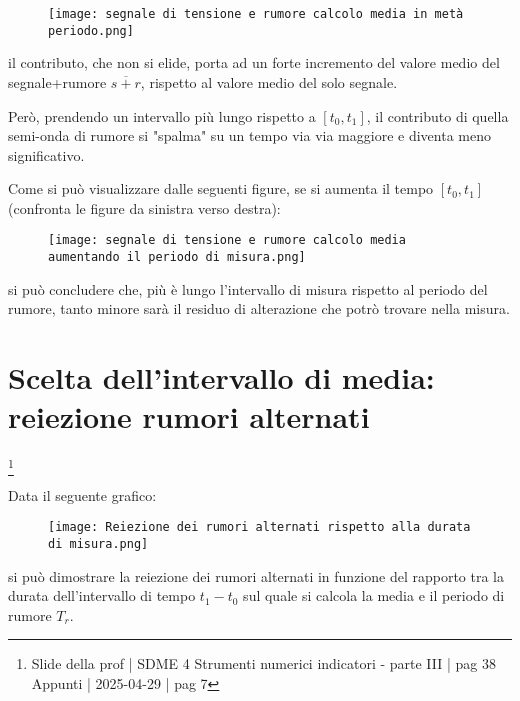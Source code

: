 \begin{figure}[h]
    \centering
    \texttt{[image: segnale di tensione e rumore calcolo media in metà periodo.png]}
\end{figure}

il contributo, che non si elide, porta ad un forte incremento del valore medio del segnale+rumore $\overline{s + r}$, 
rispetto al valore medio del solo segnale. \newline 

Però, prendendo un intervallo più lungo rispetto a $[t_0, t_1]$, 
il contributo di quella semi-onda di rumore si "spalma" su un tempo via via maggiore e diventa meno significativo. \newline 

\newpage 

Come si può visualizzare dalle seguenti figure, se si aumenta il tempo $[t_0, t_1]$ (confronta le figure da sinistra verso destra): 

\begin{figure}[h]
    \centering
    \texttt{[image: segnale di tensione e rumore calcolo media aumentando il periodo di misura.png]}
\end{figure}

si può concludere che, più è lungo l'intervallo di misura rispetto al periodo del rumore, tanto minore sarà il residuo di alterazione che potrò trovare nella misura. \newline 

\newpage 

\section{Scelta dell'intervallo di media: reiezione rumori alternati}
\footnote{Slide della prof | SDME 4 Strumenti numerici indicatori - parte III | pag 38 \\  
Appunti | 2025-04-29 | pag 7}

Data il seguente grafico: 

\begin{figure}[h]
    \centering
    \texttt{[image: Reiezione dei rumori alternati rispetto alla durata di misura.png]}
\end{figure}

si può dimostrare la reiezione dei rumori alternati in funzione del rapporto tra la durata dell'intervallo di tempo $t_1 - t_0$ sul quale si calcola la media 
e il periodo di rumore $T_r$. \newline 

